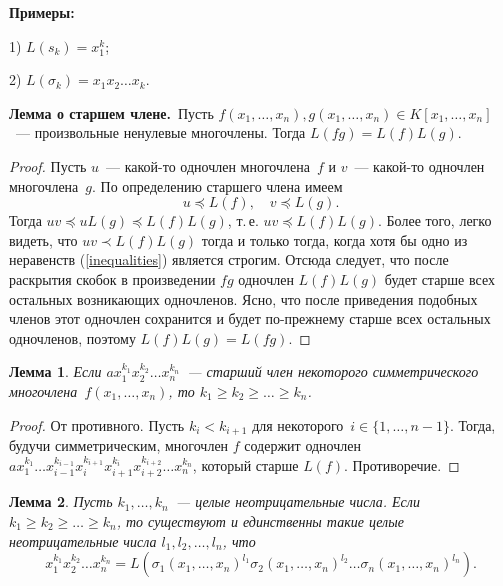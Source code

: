 \documentclass[a4paper,10pt]{amsart}
\newtheorem{lemma}{Лемма}
\theoremstyle{definition}
\theoremstyle{remark}
\begin{document}
\textbf{Примеры:}

1) $L(s_k) = x_1^k$;

2) $L(\sigma_k) = x_1x_2 \ldots x_k$.


{\bf Лемма о старшем члене.}\, Пусть $f(x_1, \ldots, x_n), g(x_1,
\ldots, x_n) \in K[x_1, \ldots, x_n]$~--- произвольные ненулевые
многочлены. Тогда $L(f g ) = L(f) L(g)$.

\begin{proof}
Пусть $u$~--- какой-то одночлен многочлена~$f$ и $v$~--- какой-то
одночлен многочлена~$g$. По определению старшего члена имеем
\begin{equation} \label{inequalities}
u \preccurlyeq L(f), \quad v \preccurlyeq L(g).
\end{equation}
Тогда $uv \preccurlyeq uL(g) \preccurlyeq L(f)L(g)$, т.\,е. $uv
\preccurlyeq L(f) L(g)$. Более того, легко видеть, что $uv \prec
L(f) L(g)$ тогда и только тогда, когда хотя бы одно из
\guillemotleft неравенств\guillemotright{} (\ref{inequalities})
является строгим. Отсюда следует, что после раскрытия скобок в
произведении $fg$ одночлен $L(f)L(g)$ будет старше всех остальных
возникающих одночленов. Ясно, что после приведения подобных членов
этот одночлен сохранится и будет по-прежнему старше всех остальных
одночленов, поэтому $L(f)L(g) = L(fg)$.
\end{proof}

\begin{lemma} \label{lemma_1}
Если $ax_1^{k_1}x_2^{k_2}\ldots x_n^{k_n}$~--- старший член
некоторого симметрического многочлена~$f(x_1, \ldots, x_n)$, то $k_1
\geqslant k_2 \geqslant \ldots \geqslant k_n$.
\end{lemma}

\begin{proof}
От противного. Пусть $k_i < k_{i+1}$ для некоторого~$i \in \lbrace
1, \ldots, n-1 \rbrace$. Тогда, будучи симметрическим, многочлен $f$
содержит одночлен $ax_1^{k_1} \ldots
x_{i-1}^{k_{i-1}}x_i^{k_{i+1}}x_{i+1}^{k_i}x_{i+2}^{k_{i+2}} \ldots
x_n^{k_n}$, который старше $L(f)$. Противоречие.
\end{proof}

\begin{lemma} \label{lemma_2}
Пусть $k_1, \ldots, k_n$~--- целые неотрицательные числа. Если $k_1
\geqslant k_2 \geqslant \ldots \geqslant k_n$, то существуют и
единственны такие целые неотрицательные числа $l_1, l_2, \ldots,
l_n$, что
$$
x_1^{k_1}x_2^{k_2}\ldots x_n^{k_n}=
L(\sigma_1(x_1,\ldots,x_n)^{l_1}\sigma_2(x_1,\ldots,x_n)^{l_2}\ldots\sigma_n(x_1,\ldots,x_n)^{l_n}).
$$
\end{lemma}
\end{document}
